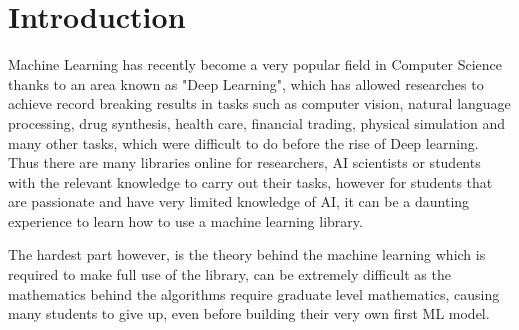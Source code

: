 \section{Introduction}
Machine Learning has recently become a very popular field in Computer Science thanks to an area known as "Deep Learning", which has allowed researches to achieve record breaking results in tasks such as computer vision, natural language processing, drug synthesis, health care, financial trading, physical simulation and many other tasks, which were difficult to do before the rise of Deep learning. Thus there are many libraries online for researchers, AI scientists or students with the relevant knowledge to carry out their tasks, however for students that are passionate and have very limited knowledge of AI, it can be a daunting experience to learn how to use a machine learning library.

The hardest part however, is the theory behind the machine learning which is required to make full use of the library, can be extremely difficult as the mathematics behind the algorithms require graduate level mathematics, causing many students to give up, even before building their very own first ML model.

